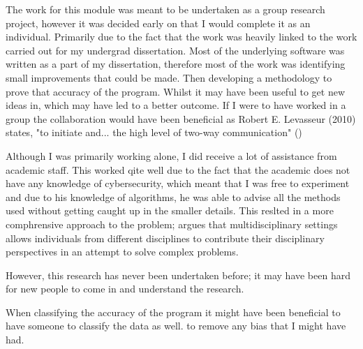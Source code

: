 The work for this module was meant to be undertaken as a group research project, however it was decided early on that I would complete it as an individual. Primarily due to the fact that the work was heavily linked to the work carried out for my undergrad dissertation. Most of the underlying software was written as a part of my dissertation, therefore most of the work was identifying small improvements that could be made. Then developing a methodology to prove that accuracy of the program. Whilst it may have been useful to get new ideas in, which may have led to a better outcome. If I were to have worked in a group the collaboration would have been beneficial as Robert E. Levasseur (2010) states, "to initiate and... the high level of two-way communication" (\cite{levasseur2010people})

Although I was primarily working alone, I did receive a lot of assistance from academic staff. This worked qite well due to the fact that the academic does not have any knowledge of cybersecurity, which meant that I was free to experiment and due to his knowledge of algorithms, he was able to advise all the methods used without getting caught up in the smaller details. This reslted in a more comphrensive approach to the problem; \citeauthor{thurow1999dynamics} argues that multidisciplinary settings allows individuals from different disciplines to contribute their disciplinary perspectives in an attempt to solve complex problems.

 However, this research has never been undertaken before; it may have been hard for new people to come in and understand the research.

When classifying the accuracy of the program it might have been beneficial to have someone to classify the data as well. to remove any bias that I might have had. 